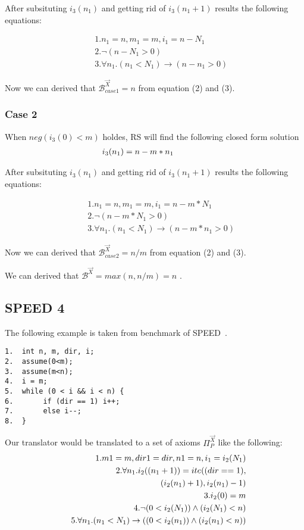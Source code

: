 After subsituting $i_3(n_1)$ and getting rid of $i_3(n_1+1)$ results the following equations:

\begin{eqnarray*}
	&&1. n_1 = n, m_1 = m, i_1 = n-N_1\\
	&&2.\neg (n-N_1>0)\\
	&&3.\forall n_1.(n_1<N_1) \rightarrow (n-n_1>0)
\end{eqnarray*}

Now we can derived that $\mathcal{B}^{\vec{X}}_{case1}=n$ from equation (2) and (3).
\subsubsection{Case 2} When $neg (i_3(0)<m)$ holdes, RS will find the following closed form solution
\begin{eqnarray*}
	&&\hspace*{-5em}i_3(n_1)=n-m*n_1
\end{eqnarray*}

After subsituting $i_3(n_1)$ and getting rid of $i_3(n_1+1)$ results the following equations:

\begin{eqnarray*}
	&&1. n_1 = n, m_1 = m, i_1 = n-m*N_1\\
	&&2.\neg (n-m*N_1>0)\\
	&&3.\forall n_1.(n_1<N_1) \rightarrow (n-m*n_1>0)
\end{eqnarray*}

Now we can derived that $\mathcal{B}^{\vec{X}}_{case2}=n/m$ from equation (2) and (3).

We can derived that $\mathcal{B}^{\vec{X}}=max(n,n/m)=n$ .

\subsection{SPEED 4}

The following example is taken from benchmark of SPEED~\cite{speed1}.
\begin{verbatim}
1.  int n, m, dir, i;
2.  assume(0<m);
3.  assume(m<n);
4.  i = m;
5.  while (0 < i && i < n) {
6.       if (dir == 1) i++;
7.       else i--;
8.  }
\end{verbatim}




Our translator would be translated to a set of axioms $\Pi_P^{\vec{X}}$ like the following:
\begin{eqnarray*}
	&&1. m1 = m, dir1 = dir, n1 = n, i_1 = i_2(N_1)\\
	&&2.\forall n_1.i_2((n_1+1)) = ite((dir==1),\\ &&\hspace*{5em}(i_2(n_1)+1),i_2(n_1)-1)\\ 
	&&3.i_2(0) = m\\
	&&4.\neg (0<i_2(N_1)) \land (i_2(N_1)<n)\\
	&&5.\forall n_1.(n_1<N_1) \rightarrow ((0<i_2(n_1)) \land (i_2(n_1)<n))
\end{eqnarray*}



